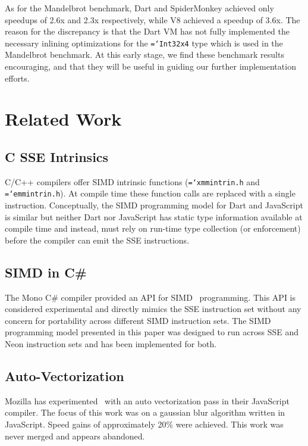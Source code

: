 \documentclass{sigplanconf}
\newcommand{\ttt}[1]{{\texttt{\hyphenchar\font=`\-\relax #1}}}%
\begin{document}
As for the Mandelbrot benchmark, Dart and SpiderMonkey achieved only speedups of
2.6x and 2.3x respectively, while V8 achieved a speedup of 3.6x.
%
The reason for the discrepancy is that the Dart VM has not fully implemented the
necessary inlining optimizations for the \ttt{Int32x4} type which is used in the
Mandelbrot benchmark.
%
At this early stage, we find these benchmark results encouraging, and that they
will be useful in guiding our further implementation efforts.


\section{Related Work}

\subsection{C SSE Intrinsics}

C/C++ compilers offer SIMD intrinsic functions (\ttt{xmmintrin.h} and
\ttt{emmintrin.h}). At compile time these function calls are replaced with a
single instruction. Conceptually, the SIMD programming model for Dart and
JavaScript is similar but neither Dart nor JavaScript has static type
information available at compile time and instead, must rely on run-time type
collection (or enforcement) before the compiler can emit the SSE instructions.

\subsection{SIMD in C\#}

The Mono C\# compiler provided an API for SIMD~\cite{monosimd} programming. This
API is considered experimental and directly mimics the SSE instruction set
without any concern for portability across different SIMD instruction sets. The
SIMD programming model presented in this paper was designed to run across SSE
and Neon instruction sets and has been implemented for both.

\subsection{Auto-Vectorization}

Mozilla has experimented~\cite{mozillasimd} with an auto vectorization pass in
their JavaScript compiler. The focus of this work was on a gaussian blur
algorithm written in JavaScript. Speed gains of approximately 20\% were
achieved. This work was never merged and appears abandoned.
\end{document}
